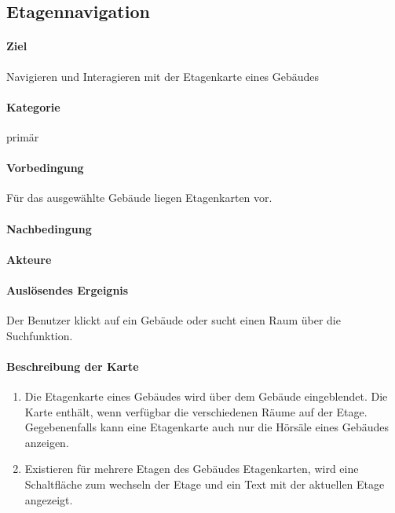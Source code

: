 \subsection{Etagennavigation}
\label{Etagennavigation}
\paragraph{Ziel}
Navigieren und Interagieren mit der Etagenkarte eines Gebäudes
\paragraph{Kategorie}
primär
\paragraph{Vorbedingung}
Für das ausgewählte Gebäude liegen Etagenkarten vor.
\paragraph{Nachbedingung}

\paragraph{Akteure}

\paragraph{Auslösendes Ergeignis}
Der Benutzer klickt auf ein Gebäude oder sucht einen Raum über die Suchfunktion.
\paragraph{Beschreibung der Karte}
\begin{enumerate}
    \item Die Etagenkarte eines Gebäudes wird über dem Gebäude eingeblendet. Die Karte enthält, wenn verfügbar die verschiedenen Räume auf der Etage. Gegebenenfalls kann eine Etagenkarte auch nur die Hörsäle eines Gebäudes anzeigen.
    \item Existieren für mehrere Etagen des Gebäudes Etagenkarten, wird eine Schaltfläche zum wechseln der Etage und ein Text mit der aktuellen Etage angezeigt.
\end{enumerate}
